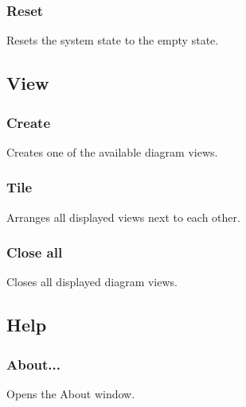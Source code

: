 \documentclass[a4paper,titlepage,oneside,final]{scrreprt} %
\begin{document}
\subsubsection{Reset}
Resets the system state to the empty state.
\subsection{View}
\subsubsection{Create}
Creates one of the available diagram views.
\subsubsection{Tile}
Arranges all displayed views next to each other.
\subsubsection{Close all}
Closes all displayed diagram views.
\subsection{Help}
\subsubsection{About...}
Opens the About window.
\end{document}
